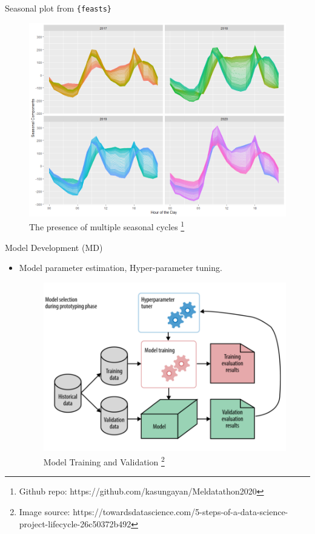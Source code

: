 \documentclass[12pt,ignorenonframetext,]{beamer}
\providecommand{\tightlist}{%
  \setlength{\itemsep}{0pt}\setlength{\parskip}{0pt}}
\begin{document}
\begin{frame}{Seasonal plot from \texttt{\{feasts\}}}
\protect\hypertarget{seasonal-plot-from}{}

\begin{figure}
  \includegraphics[width=.55\textwidth,height=.55\textheight,keepaspectratio]{images/daily_seasonal.png}
  \caption{The presence of multiple seasonal cycles%
    \footnote{%
     \tiny{Github repo: https://github.com/kasungayan/Meldatathon2020} 
    }%
  }
\end{figure}

\end{frame}

\begin{frame}{Model Development (MD)}
\protect\hypertarget{model-development-md}{}

\begin{itemize}
\tightlist
\item
  Model parameter estimation, Hyper-parameter tuning. \vspace{2mm}

  \begin{figure}
  \includegraphics[width=.6\textwidth,height=.6\textheight,keepaspectratio]{images/model_validation.PNG}
  \caption{Model Training and Validation%
    \footnote{%
     \tiny{Image source: https://towardsdatascience.com/5-steps-of-a-data-science-project-lifecycle-26c50372b492} 
    }%
  }
  \end{figure}
\end{itemize}

\end{frame}
\end{document}
